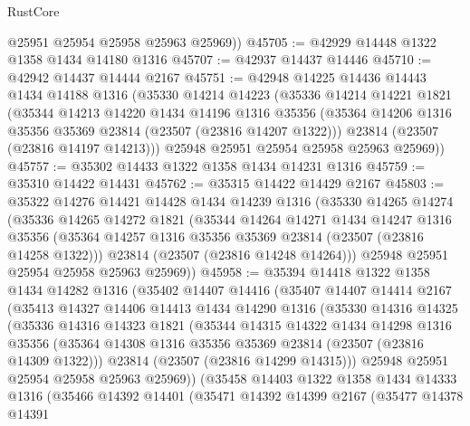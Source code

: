 \begin{lexlean}{RustCore}
\begin{coremodule}
        @25951
        @25954
        @25958
        @25963
        @25969))
@45705 := @42929 @14448 @1322 @1358 @1434 @14180 @1316
@45707 := @42937 @14437 @14446
@45710 := @42942 @14437 @14444 @2167
@45751 := @42948
    @14225
    @14436
    @14443
    @1434
    @14188
    @1316
    (@35330
      @14214
      @14223
      (@35336
        @14214
        @14221
        @1821
        (@35344
          @14213
          @14220
          @1434
          @14196
          @1316
          @35356
          (@35364 @14206 @1316 @35356 @35369 @23814 (@23507 (@23816 @14207 @1322)))
          @23814
          (@23507 (@23816 @14197 @14213)))
        @25948
        @25951
        @25954
        @25958
        @25963
        @25969))
@45757 := @35302 @14433 @1322 @1358 @1434 @14231 @1316
@45759 := @35310 @14422 @14431
@45762 := @35315 @14422 @14429 @2167
@45803 := @35322
    @14276
    @14421
    @14428
    @1434
    @14239
    @1316
    (@35330
      @14265
      @14274
      (@35336
        @14265
        @14272
        @1821
        (@35344
          @14264
          @14271
          @1434
          @14247
          @1316
          @35356
          (@35364 @14257 @1316 @35356 @35369 @23814 (@23507 (@23816 @14258 @1322)))
          @23814
          (@23507 (@23816 @14248 @14264)))
        @25948
        @25951
        @25954
        @25958
        @25963
        @25969))
@45958 := @35394
    @14418
    @1322
    @1358
    @1434
    @14282
    @1316
    (@35402
      @14407
      @14416
      (@35407
        @14407
        @14414
        @2167
        (@35413
          @14327
          @14406
          @14413
          @1434
          @14290
          @1316
          (@35330
            @14316
            @14325
            (@35336
              @14316
              @14323
              @1821
              (@35344
                @14315
                @14322
                @1434
                @14298
                @1316
                @35356
                (@35364 @14308 @1316 @35356 @35369 @23814 (@23507 (@23816 @14309 @1322)))
                @23814
                (@23507 (@23816 @14299 @14315)))
              @25948
              @25951
              @25954
              @25958
              @25963
              @25969))
          (@35458
            @14403
            @1322
            @1358
            @1434
            @14333
            @1316
            (@35466
              @14392
              @14401
              (@35471
                @14392
                @14399
                @2167
                (@35477
                  @14378
                  @14391

\end{coremodule}
\end{lexlean}
